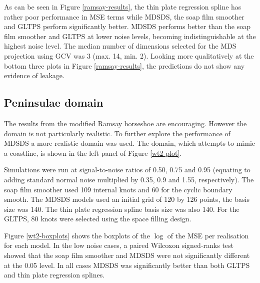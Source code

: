 \documentclass[smallextended]{svjour3}       %
\begin{document}
As can be seen in Figure \ref{ramsay-results}, the thin plate regression spline has rather poor performance in MSE terms while MDSDS, the soap film smoother and GLTPS perform significantly better. MDSDS performs better than the soap film smoother and GLTPS at lower noise levels, becoming indistinguishable at the highest noise level. The median number of dimensions selected for the MDS projection using GCV was 3 (max. 14, min. 2). Looking more qualitatively at the bottom three plots in Figure \ref{ramsay-results}, the predictions do not show any evidence of leakage.


\subsection{Peninsulae domain}

The results from the modified Ramsay horseshoe are encouraging. However the domain is not particularly realistic. To further explore the performance of MDSDS a more realistic domain was used. The domain, which attempts to mimic a coastline, is shown in the left panel of Figure \ref{wt2-plot}.

Simulations were run at signal-to-noise ratios of 0.50, 0.75 and 0.95 (equating to adding standard normal noise multiplied by 0.35, 0.9 and 1.55, respectively). The soap film smoother used 109 internal knots and 60 for the cyclic boundary smooth. The MDSDS models used an initial grid of 120 by 126 points, the basis size was 140. The thin plate regression spline basis size was also 140. For the GLTPS, 80 knots were selected using the space filling design.

Figure \ref{wt2-boxplots} shows the boxplots of the $\log$ of the MSE per realisation for each model. In the low noise cases, a paired Wilcoxon signed-ranks test showed that the soap film smoother and MDSDS were not significantly different at the 0.05 level. In all cases MDSDS was significantly better than both GLTPS and thin plate regression splines.

\end{document}
